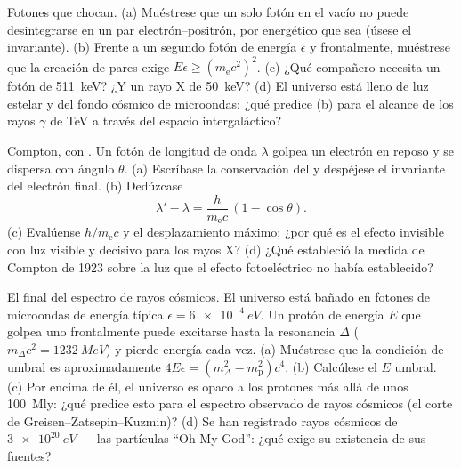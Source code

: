 \begin{exercise}[$\star\star$]\label{exo:b3:relativistic-dynamics:9}
Fotones que chocan. (a) Muéstrese que un solo fotón en el vacío no puede
desintegrarse en un par electrón--positrón, por energético que sea (úsese el
invariante). (b) Frente a un segundo fotón de energía $\epsilon$ y
frontalmente, muéstrese que la creación de pares exige
$E\epsilon \ge (m_{\text{e}}c^2)^2$. (c) ¿Qué compañero necesita un fotón de
\qty{511}{keV}? ¿Y un rayo X de \qty{50}{keV}? (d) El universo está lleno de
luz estelar y del fondo cósmico de microondas: ¿qué predice (b) para el
alcance de los rayos $\gamma$ de TeV a través del espacio intergaláctico?
\end{exercise}

\begin{exercise}[$\star\star\star$]\label{exo:b3:relativistic-dynamics:10}
Compton, con . Un fotón de longitud de onda $\lambda$ golpea
un electrón en reposo y se dispersa con ángulo $\theta$. (a) Escríbase la
conservación del  y despéjese el invariante del electrón final.
(b) Dedúzcase
\[
\lambda' - \lambda = \frac{h}{m_{\text{e}}c}\,(1 - \cos\theta) .
\]
(c) Evalúense $h/m_{\text{e}}c$ y el desplazamiento máximo; ¿por qué es el
efecto invisible con luz visible y decisivo para los rayos X? (d) ¿Qué
estableció la medida de Compton de 1923 sobre la luz que el efecto
fotoeléctrico no había establecido?
\end{exercise}

\begin{exercise}[$\star\star\star$]\label{exo:b3:relativistic-dynamics:11}
El final del espectro de rayos cósmicos. El universo está bañado en fotones
de microondas de energía típica $\epsilon = \qty{6e-4}{eV}$. Un protón de
energía $E$ que golpea uno frontalmente puede excitarse hasta la resonancia
$\Delta$ ($m_\Delta c^2 = \qty{1232}{MeV}$) y pierde energía cada
vez. (a) Muéstrese que la condición de umbral es aproximadamente $4E\epsilon =
(m_\Delta^2 - m_{\text{p}}^2)c^4$. (b) Calcúlese el $E$ umbral.
(c) Por encima de él, el universo es opaco a los protones más allá de unos
\qty{100}{Mly}: ¿qué predice esto para el espectro observado de rayos
cósmicos (el corte de Greisen--Zatsepin--Kuzmin)? (d) Se han registrado
rayos cósmicos de $\qty{3e20}{eV}$ --- las partículas ``Oh-My-God'': ¿qué
exige su existencia de sus fuentes?
\end{exercise}

